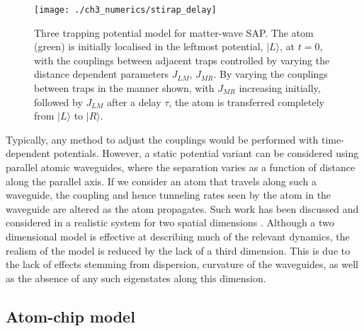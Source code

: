 \begin{figure}
    \centering
    \texttt{[image: ./ch3\_numerics/stirap\_delay]}
    \caption{Three trapping potential model for matter-wave SAP. The atom (green) is initially localised in the leftmost potential, $|L\rangle$, at $t=0$, with the couplings between adjacent traps controlled by varying the distance dependent parameters $J_{LM}$, $J_{MR}$. By varying the couplings between traps in the manner shown, with $J_{MR}$ increasing initially, followed by $J_{LM}$ after a delay $\tau$, the atom is transferred completely from $|L\rangle$ to $| R \rangle$.}
    \label{fig:ch3_stirap}
\end{figure}

Typically, any method to adjust the couplings would be performed with time-dependent potentials. However, a static potential variant can be considered using parallel atomic waveguides, where the separation varies as a function of distance along the parallel axis. If we consider an atom that travels along such a waveguide, the coupling and hence tunneling rates seen by the atom in the waveguide are altered as the atom propagates. Such work has been discussed and considered in a realistic system for two spatial dimensions \cite{OSullivan:10}. Although a two dimensional model is effective at describing much of the relevant dynamics, the realism of the model is reduced by the lack of a third dimension. This is due to the lack of effects stemming from dispersion, curvature of the waveguides, as well as the absence of any such eigenstates along this dimension.

\subsection{Atom-chip model}


